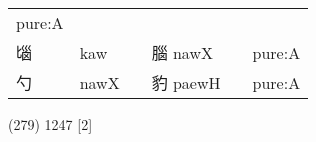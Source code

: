 \documentclass[14pt,a4paper]{scrartcl}
\begin{document}
\begin{longtable}[c]{@{}llllll@{}}
\begin{minipage}[t]{0.14\columnwidth}
pure:A
\strut\end{minipage}\tabularnewline
\begin{minipage}[t]{0.14\columnwidth}\raggedright\strut
匘
\strut\end{minipage} &
\begin{minipage}[t]{0.14\columnwidth}\raggedright\strut
kaw
\strut\end{minipage} &
\begin{minipage}[t]{0.14\columnwidth}\raggedright\strut
\strut\end{minipage} &
\begin{minipage}[t]{0.14\columnwidth}\raggedright\strut
腦 nawX
\strut\end{minipage} &
\begin{minipage}[t]{0.14\columnwidth}\raggedright\strut
\strut\end{minipage} &
\begin{minipage}[t]{0.14\columnwidth}\raggedright\strut
pure:A
\strut\end{minipage}\tabularnewline
\begin{minipage}[t]{0.14\columnwidth}\raggedright\strut
勺
\strut\end{minipage} &
\begin{minipage}[t]{0.14\columnwidth}\raggedright\strut
nawX
\strut\end{minipage} &
\begin{minipage}[t]{0.14\columnwidth}\raggedright\strut
\strut\end{minipage} &
\begin{minipage}[t]{0.14\columnwidth}\raggedright\strut
豹 paewH
\strut\end{minipage} &
\begin{minipage}[t]{0.14\columnwidth}\raggedright\strut
\strut\end{minipage} &
\begin{minipage}[t]{0.14\columnwidth}\raggedright\strut
pure:A
\strut\end{minipage}\tabularnewline
\bottomrule
\end{longtable}

(279) 1247 {[}2{]}
\end{document}

